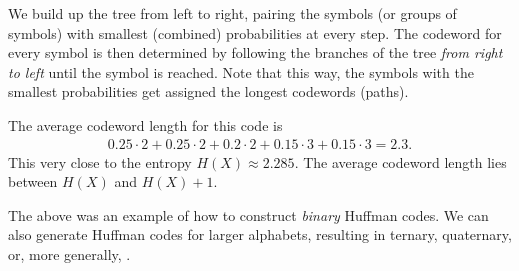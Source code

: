 \begin{example}
\begin{center}
\end{center}
We build up the tree from left to right, pairing the symbols (or groups of symbols) with smallest (combined) probabilities at every step. The codeword for every symbol is then determined by following the branches of the tree \emph{from right to left} until the symbol is reached. Note that this way, the symbols with the smallest probabilities get assigned the longest codewords (paths).

The average codeword length for this code is
\begin{align}
0.25 \cdot 2 + 0.25 \cdot 2 + 0.2 \cdot 2 + 0.15 \cdot 3 + 0.15 \cdot 3 = 2.3. 
\end{align}
This very close to the entropy $H(X) \approx 2.285$. The average codeword length lies between $H(X)$ and $H(X) + 1$.
\end{example}

The above was an example of how to construct \emph{binary} Huffman codes. We can also generate Huffman codes for larger alphabets, resulting in ternary, quaternary, or, more generally, .

